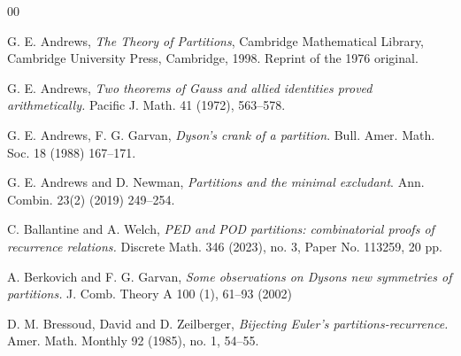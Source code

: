 \documentclass{amsart}
\theoremstyle{definition}
\begin{document}
\begin{thebibliography}{00}




 
G. E. Andrews, 
\textit{The Theory of Partitions}, 
Cambridge Mathematical Library, Cambridge University Press, Cambridge, 1998. Reprint of the 1976 original.
 

 G. E. Andrews,  \textit{Two theorems of Gauss and allied identities proved arithmetically.} Pacific J. Math. 41 (1972), 563--578.

 G. E. Andrews, F. G. Garvan, \textit{Dyson’s crank of a partition}. Bull. Amer. Math. Soc. 18 (1988) 167--171.

 G. E. Andrews and D. Newman, \textit{Partitions and the minimal excludant}. Ann. Combin. 23(2) (2019) 249--254.

 C. Ballantine and A. Welch, \textit{PED and POD partitions: combinatorial proofs of recurrence relations.} Discrete Math. 346 (2023), no. 3, Paper No. 113259, 20 pp.

 A. Berkovich and F. G. Garvan,  \textit{Some observations on Dysons new symmetries of partitions.} J. Comb. Theory A 100 (1), 61--93 (2002)





 D. M. Bressoud, David and D. Zeilberger,  \textit{Bijecting Euler's partitions-recurrence.} Amer. Math. Monthly 92 (1985), no. 1, 54--55.




\end{thebibliography}
\end{document}
